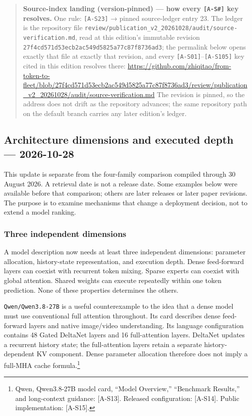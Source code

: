\begin{quote}
\textbf{Source-index landing (version-pinned) --- how every
\texttt{{[}A-S\#{]}} key resolves.} One rule: \texttt{\mbox{{[}A-S23{]}}} →
pinned source-ledger entry 23. The ledger is the repository file
\texttt{review/publication\_v2\_20261028/audit/source-verification.md},
read at this edition's immutable revision
\texttt{27f4cd571d53ecb2ac549d5825a77c87f8736ad3}; the permalink below
opens exactly that file at exactly that revision, and every
\texttt{\mbox{{[}A-S01{]}}}--\texttt{\mbox{{[}A-S105{]}}} key cited in this edition
resolves there:
\url{https://github.com/zhiqitao/from-token-to-fleet/blob/27f4cd571d53ecb2ac549d5825a77c87f8736ad3/review/publication_v2_20261028/audit/source-verification.md}
The revision is pinned, so the address does not drift as the repository
advances; the same repository path on the default branch carries any
later edition's ledger.
\end{quote}

\subsection*{Architecture dimensions and executed depth ---
2026-10-28}\label{architecture-dimensions-and-executed-depth-2026-10-28}

This update is separate from the four-family comparison compiled through
30 August 2026. A retrieval date is not a release date. Some examples
below were available before that comparison; others are later releases
or later paper revisions. The purpose is to examine mechanisms that
change a deployment decision, not to extend a model ranking.

\subsubsection*{Three independent
dimensions}\label{three-independent-dimensions}

A model description now needs at least three independent dimensions:
parameter allocation, history-state representation, and execution depth.
Dense feed-forward layers can coexist with recurrent token mixing.
Sparse experts can coexist with global attention. Shared weights can
execute repeatedly within one token prediction. None of these properties
determines the others.

\texttt{Qwen/Qwen3.8-27B} is a useful counterexample to the idea that a
dense model must use conventional full attention throughout. Its card
describes dense feed-forward layers and native image/video
understanding. Its language configuration contains 48 Gated DeltaNet
layers and 16 full-attention layers. DeltaNet updates a recurrent
history state; the full-attention layers retain a separate
history-dependent KV component. Dense parameter allocation therefore
does not imply a full-MHA cache formula.\footnote{Qwen, Qwen3.8-27B
  model card, ``Model Overview,'' ``Benchmark Results,'' and
  long-context guidance: \mbox{{[}A-S13{]}}. Released configuration:
  \mbox{{[}A-S14{]}}. Public implementation: \mbox{{[}A-S15{]}}.}

